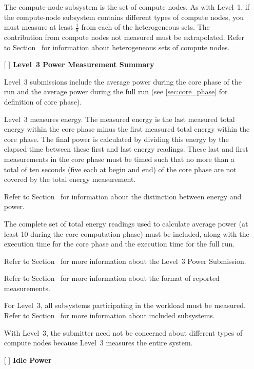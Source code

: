 \begin{itemize}
The compute-node subsystem is the set of compute nodes.
As with Level~1, if the compute-node subsystem contains different types of compute nodes, you must measure at least $\frac{1}{8}$ from each of the heterogeneous sets.
The contribution from compute nodes not measured must be extrapolated.
Refer to Section~ for information about heterogeneous sets of compute nodes.

\newpage
\item[{[ ]}]
\textbf{Level~3 Power Measurement Summary}

Level~3 submissions include the average power during the core phase of the run and the average power during the full run (see \ref{sec:core_phase} for definition of core phase).

Level~3 measures energy.
The measured energy is the last measured total energy within the core phase minus the first measured total energy within the core phase.
The final power is calculated by dividing this energy by the elapsed time between these first and last energy readings.
These last and first measurements in the core phase must be timed such that no more than a total of ten seconds (five each at begin and end) of the core phase are not covered by the total energy measurement.

Refer to Section~ for information about the distinction between energy and power.

The complete set of total energy readings used to calculate average power (at least 10 during the core computation phase) must be included, along with the execution time for the core phase and the execution time for the full run.

Refer to Section~ for more information about the Level~3 Power Submission.

Refer to Section~ for more information about the format of reported measurements.

For Level~3, all subsystems participating in the workload must be measured.
Refer to Section~ for more information about included subsystems.

With Level~3, the submitter need not be concerned about different types of compute nodes because Level~3 measures the entire system.


\item[{[ ]}]
\textbf{Idle Power}


\end{itemize}
